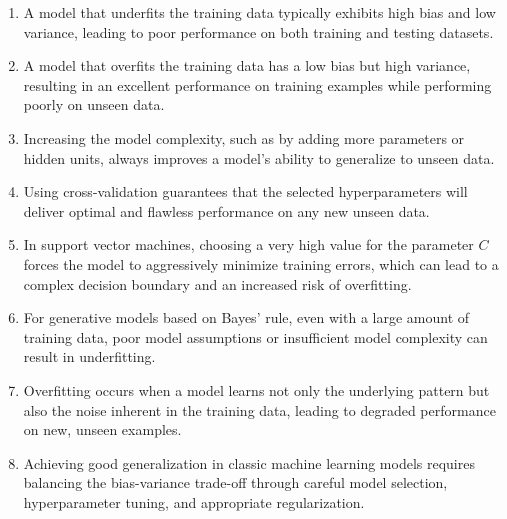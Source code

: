 \documentclass[12pt]{article}
\begin{document}
\begin{enumerate}
    \item A model that underfits the training data typically exhibits high bias and low variance, leading to poor performance on both training and testing datasets.
    \item A model that overfits the training data has a low bias but high variance, resulting in an excellent performance on training examples while performing poorly on unseen data.
    \item Increasing the model complexity, such as by adding more parameters or hidden units, always improves a model's ability to generalize to unseen data.
    \item Using cross-validation guarantees that the selected hyperparameters will deliver optimal and flawless performance on any new unseen data.
    \item In support vector machines, choosing a very high value for the parameter \( C \) forces the model to aggressively minimize training errors, which can lead to a complex decision boundary and an increased risk of overfitting.
    \item For generative models based on Bayes’ rule, even with a large amount of training data, poor model assumptions or insufficient model complexity can result in underfitting.
    \item Overfitting occurs when a model learns not only the underlying pattern but also the noise inherent in the training data, leading to degraded performance on new, unseen examples.
    \item Achieving good generalization in classic machine learning models requires balancing the bias-variance trade-off through careful model selection, hyperparameter tuning, and appropriate regularization.
\end{enumerate}
\end{document}
